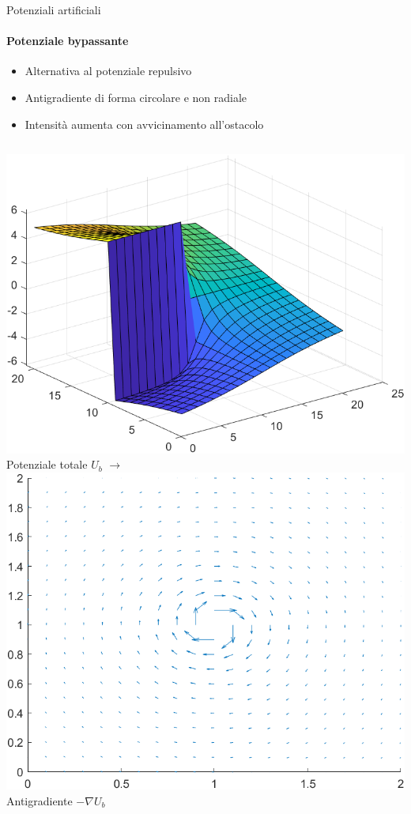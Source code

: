 \documentclass[handout]{beamer}
\begin{document}
\begin{frame}{Potenziali artificiali}
\framesubtitle{Potenziale bypassante}
\begin{itemize}
\item Alternativa al potenziale repulsivo
\item Antigradiente di forma circolare e non radiale
\item Intensità aumenta con avvicinamento all'ostacolo
\end{itemize}
\vspace{5mm}
\begin{columns}
\centering
\includegraphics[width=\textwidth]{potB.png} \\
Potenziale totale $U_b$
\centering
$\rightarrow$
\centering
\includegraphics[width=\textwidth]{antigradB.png} \\
Antigradiente $-\nabla U_b$
\end{columns}
\end{frame}
\end{document}
